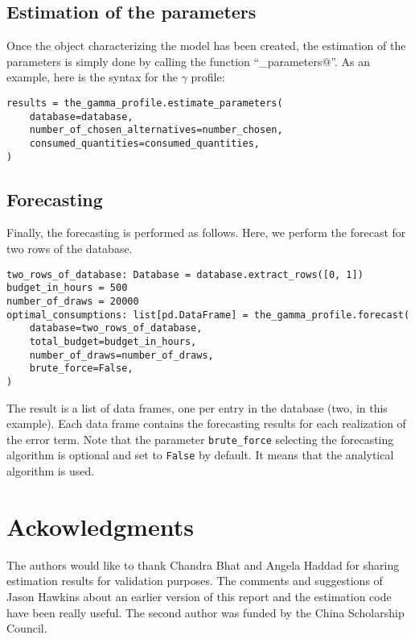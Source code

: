 \documentclass[12pt,a4paper]{article}
\begin{document}
\subsection{Estimation of the parameters}

Once the object characterizing the model has been created, the estimation of the parameters is simply done by calling the function ``\lstinline@estimate_parameters@''. As an example, here is the syntax  for the $\gamma$ profile:
\begin{center}
         \begin{lstlisting}
results = the_gamma_profile.estimate_parameters(
    database=database,
    number_of_chosen_alternatives=number_chosen,
    consumed_quantities=consumed_quantities,
)
          \end{lstlisting}
     \end{center}

\subsection{Forecasting}

Finally, the forecasting is performed as follows. Here, we perform the forecast for two rows of the database.
\begin{center}
         \begin{lstlisting}
two_rows_of_database: Database = database.extract_rows([0, 1])
budget_in_hours = 500
number_of_draws = 20000
optimal_consumptions: list[pd.DataFrame] = the_gamma_profile.forecast(
    database=two_rows_of_database,
    total_budget=budget_in_hours,
    number_of_draws=number_of_draws,
    brute_force=False,
)
          \end{lstlisting}
     \end{center}
The result is a list of data frames, one per entry in the database (two, in this example). Each data frame contains
the forecasting results for each realization of the error term. Note that the parameter \lstinline{brute_force} selecting the forecasting algorithm is
optional and set to \lstinline{False} by default. It means that the analytical algorithm is used.

\section{Ackowledgments}

The authors would like to thank Chandra Bhat and Angela Haddad for sharing estimation results for validation purposes.
The comments and suggestions of Jason Hawkins about an earlier version of this report and the estimation code have been really useful.
The second author was funded by the China Scholarship Council.
\end{document}
